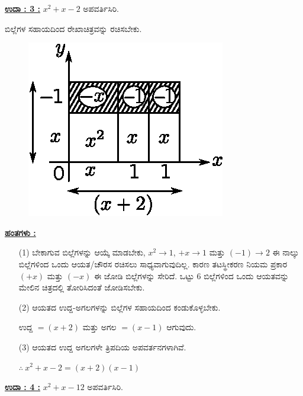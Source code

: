 \noindent
{\textbf{\underline{ಉದಾ : 3 :}}} $x^2 + x - 2$ ಅಪವರ್ತಿಸಿರಿ. 

ಬಿಲ್ಲೆಗಳ ಸಹಾಯದಿಂದ ರೇಖಾಚಿತ್ರವನ್ನು ರಚಿಸಬೇಕು.
\begin{figure}[H]
\centering
\includegraphics[scale=0.8]{src/figure/chap3/fig3-41.eps}
\end{figure}

\noindent
{\textbf{\underline{ಹಂತಗಳು :}}}
\begin{itemize}
\item [(1)] ಬೇಕಾಗುವ ಬಿಲ್ಲೆಗಳನ್ನು ಆಯ್ಕೆ ಮಾಡಬೇಕು, $x^2 \rightarrow 1$, $+x \rightarrow 1$ ಮತ್ತು $(-1) \rightarrow 2$ ಈ ನಾಲ್ಕು ಬಿಲ್ಲೆಗಳಿಂದ ಒಂದು ಆಯತ/ಚೌರಸ ರಚಿಸಲು ಸಾಧ್ಯವಾಗುವುದಿಲ್ಲ. ಕಾರಣ ತಟಸ್ಥೀಕರಣ ನಿಯಮ ಪ್ರಕಾರ $(+x)$ ಮತ್ತು $(-x)$ ಈ ಜೋಡಿ ಬಿಲ್ಲೆಗಳನ್ನು ಸೇರಿದೆ. ಒಟ್ಟು 6 ಬಿಲ್ಲೆಗಳಿಂದ ಒಂದು ಆಯತವನ್ನು ಮೇಲಿನ ಚಿತ್ರದಲ್ಲಿ ತೋರಿಸಿದಂತೆ ಜೋಡಿಸಬೇಕು. 

\item [(2)] ಆಯತದ ಉದ್ದ-ಅಗಲಗಳನ್ನು ಬಿಲ್ಲೆಗಳ ಸಹಾಯದಿಂದ ಕಂಡುಕೊಳ್ಳಬೇಕು. 

ಉದ್ದ $= (x+2)$ ಮತ್ತು ಅಗಲ $= (x-1)$ ಆಗುವುದು. 

\item [(3)] ಆಯತದ ಉದ್ದ ಅಗಲಗಳೇ ತ್ರಿಪದಿಯ ಅಪವರ್ತನಗಳಾಗಿವೆ.

$\therefore~ x^2 + x - 2 = (x+2)(x-1)$
\end{itemize}

\medskip

\noindent
{\textbf{\underline{ಉದಾ : 4 :}}} $x^2 + x - 12$ ಅಪವರ್ತಿಸಿರಿ. 

